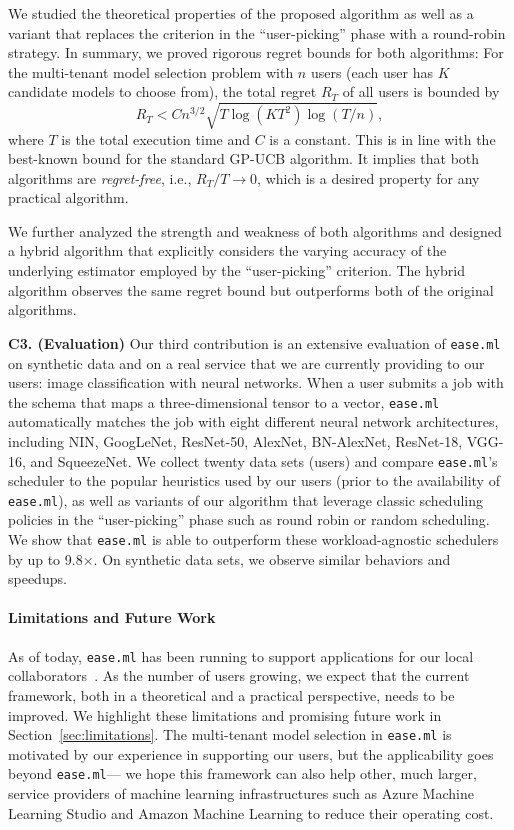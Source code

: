 \documentclass[letterpaper]{vldb}
\newcommand{\eml}{\texttt{ease.ml}\xspace}
\begin{document}
We studied the theoretical properties of the proposed algorithm as well as a variant that replaces the criterion in the ``user-picking'' phase with a round-robin strategy.
In summary, we proved rigorous regret bounds for both algorithms: For the multi-tenant model selection problem 
with $n$ users (each user has $K$ candidate models to choose from), 
the total regret $R_T$ of all users is bounded by
\vspace{-0.25em}
\[
R_T < C n^{3/2}\sqrt{T \log(KT^2)\log(T/n)},
\]
where $T$ is the total execution time
and $C$ is a constant.
This is in line with the best-known bound for the standard GP-UCB algorithm.
It implies that both algorithms are \emph{regret-free}, i.e., $R_T/T \rightarrow 0$, which is a desired property for any practical algorithm.

We further analyzed the strength and weakness of both algorithms and designed a hybrid algorithm that explicitly considers
the varying accuracy of the underlying estimator employed by the ``user-picking'' criterion.
The hybrid algorithm observes the same regret bound but outperforms both of the original algorithms.


\noindent
{\bf C3. (Evaluation)} Our third contribution is an extensive
evaluation of \eml on synthetic data and on a real service that we are currently providing to our users: image classification 
with neural networks.
When a user submits a job with the schema
that maps a three-dimensional tensor to
a vector, \eml automatically matches the job with eight
different neural network architectures, including
NIN, GoogLeNet, ResNet-50, AlexNet,
BN-AlexNet, ResNet-18, VGG-16,
and SqueezeNet. We collect twenty 
data sets (users) and compare
\eml's scheduler to the popular heuristics 
used by our users (prior to the availability of \eml), as well as variants of our algorithm that leverage classic scheduling policies in the ``user-picking'' phase such as round robin or random scheduling.
We show that \eml is able to outperform
these workload-agnostic schedulers
by up to 9.8$\times$.
On synthetic data sets, we observe similar behaviors and speedups.

\vspace{-0.75em}
\paragraph*{Limitations and Future Work}
As of today, \eml has been running to support 
applications for our local collaborators~\cite{Schawinski2017}. 
As the number of users growing, we
expect that the current framework, both in a
theoretical and a practical perspective,
needs to be improved. We highlight these
limitations and promising future work in 
Section~\ref{sec:limitations}. The multi-tenant
model selection in \eml is motivated by
our experience in supporting our users, but 
the applicability goes beyond \eml --- we hope
this framework can also help other, much larger, service providers
of machine learning infrastructures such as 
Azure Machine Learning Studio
and Amazon Machine Learning
to reduce their operating
cost.
\end{document}

